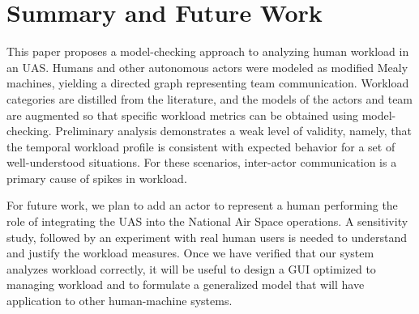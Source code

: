 \section{Summary and Future Work}
This paper proposes a model-checking approach to analyzing human workload in an UAS.  Humans and other autonomous actors were modeled as modified Mealy machines, yielding a directed graph representing team communication.  Workload categories are distilled from the literature, and the models of the actors and team are augmented so that specific workload metrics can be obtained using model-checking.  Preliminary analysis demonstrates a weak level of validity, namely, that the temporal workload profile is consistent with expected behavior for a set of well-understood situations.  For these scenarios, inter-actor communication is a primary cause of spikes in workload. 

For future work, we plan to add an actor to represent a human performing the role of integrating the UAS into the National Air Space operations. A sensitivity study, followed by an experiment with real human users is needed to understand and justify the workload measures. Once we have verified that our system analyzes workload correctly, it will be useful to design a GUI optimized to managing workload and to formulate a generalized model that will have application to other human-machine systems.
